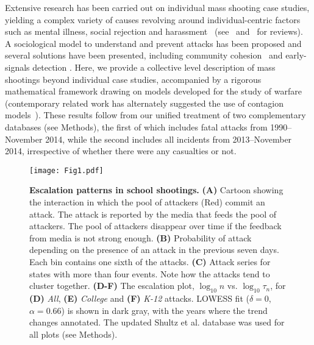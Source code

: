 Extensive research has been carried out on individual mass shooting
case studies, yielding a complex variety of causes revolving around
individual-centric factors such as mental illness, social rejection
and harassment~\cite{Newman2004,Flannery2013,Kimmel2003,Leary2003}
(see~\cite{Muschert2006} and~\cite{O2000} for reviews). 
A sociological model to understand and prevent attacks has been proposed
\cite{Levin2009} and several solutions have been presented, including
community cohesion~\cite{Newman2004} and early-signals detection
\cite{Wike2009, Borum2010}. 
Here, we provide a collective level description of mass shootings
beyond individual case
studies, accompanied by a rigorous mathematical framework 
drawing on models developed for the study of warfare
(contemporary related work has alternately suggested the use of contagion models~\cite{towers2015a}).
These results follow from our unified treatment of two
complementary databases (see Methods), the first of which includes
fatal attacks from 1990--November 2014, while the second includes all
incidents from 2013--November 2014, irrespective of whether there were
any casualties or not.

\begin{figure*}[ht!]
  \centering
  \texttt{[image: Fig1.pdf]}
  \caption{
    \textbf{Escalation patterns in school shootings.}
    \textbf{(A)} Cartoon showing the interaction in which the pool of attackers
    (Red) commit an attack. The attack is reported by the media that feeds
    the pool of attackers. The pool of attackers disappear over time if
    the feedback from media is not strong enough.
    \textbf{(B)} Probability of
    attack depending on the presence of an attack in the previous seven
    days. Each bin contains one sixth of the attacks.
    \textbf{(C)} Attack series
    for states with more than four events. Note how the attacks tend to
    cluster together.
    \textbf{(D-F)} The escalation plot, $\log_{10}{n}$
    vs. $\log_{10}{\tau_n}$, for 
    \textbf{(D)} \textit{All}, 
    \textbf{(E)} \textit{College}
    and \textbf{(F)} 
    \textit{K-12} attacks. LOWESS fit ($\delta = 0$, $\alpha =
    0.66$) is shown in dark gray, with the years where the trend changes
    annotated. The updated Shultz et al. database was used for all plots
    (see Methods).
  }
\label{fig:escalation}
\end{figure*}

